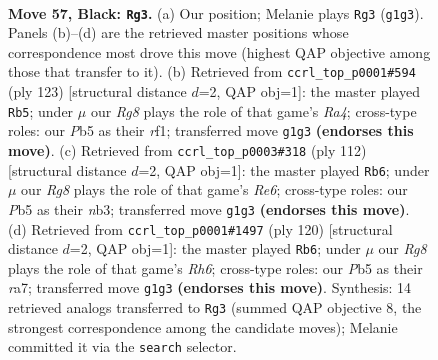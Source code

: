 \documentclass[11pt]{article}
\begin{document}
\clearpage

\begin{figure}[p]\centering
\begin{subfigure}{0.46\textwidth}\centering
\resizebox{\linewidth}{!}{%
\newchessgame
\chessboard[
  setfen={8/5K2/8/1p5k/8/8/8/6r1 b - - 9 57},
  showmover=false,
  pgfstyle=straightmove, color=movearrow, markmove={g1-g3}
]}
\caption{}
\end{subfigure}\hfill
\begin{subfigure}{0.46\textwidth}\centering
\resizebox{\linewidth}{!}{%
\newchessgame
\chessboard[
  setfen={2k5/8/4K3/r7/8/8/8/5R2 b - - 5 62},
  showmover=false,
  pgfstyle=straightmove, color=movearrow, markmove={a5-b5}
]}
\caption{}
\end{subfigure}
\\[4pt]
\begin{subfigure}{0.46\textwidth}\centering
\resizebox{\linewidth}{!}{%
\newchessgame
\chessboard[
  setfen={8/8/4R3/6k1/8/1n4K1/8/8 w - - 1 57},
  showmover=false,
  pgfstyle=straightmove, color=movearrow, markmove={e6-b6}
]}
\caption{}
\end{subfigure}\hfill
\begin{subfigure}{0.46\textwidth}\centering
\resizebox{\linewidth}{!}{%
\newchessgame
\chessboard[
  setfen={8/r7/7R/8/6k1/2K5/8/8 w - - 1 61},
  showmover=false,
  pgfstyle=straightmove, color=movearrow, markmove={h6-b6}
]}
\caption{}
\end{subfigure}
\caption{\textbf{Move 57, Black: \texttt{Rg3}.} (a) Our position; Melanie plays \texttt{Rg3} (\texttt{g1g3}). Panels (b)--(d) are the retrieved master positions whose correspondence most drove this move (highest QAP objective among those that transfer to it). (b) Retrieved from \texttt{ccrl\_top\_p0001\#594} (ply 123) [structural distance $d$=2, QAP obj=1]: the master played \texttt{Rb5}; under $\mu$ our \emph{Rg8} plays the role of that game's \emph{Ra4}; cross-type roles: our \emph{P}b5 as their \emph{r}f1; transferred move \texttt{g1g3} \textbf{(endorses this move)}. (c) Retrieved from \texttt{ccrl\_top\_p0003\#318} (ply 112) [structural distance $d$=2, QAP obj=1]: the master played \texttt{Rb6}; under $\mu$ our \emph{Rg8} plays the role of that game's \emph{Re6}; cross-type roles: our \emph{P}b5 as their \emph{n}b3; transferred move \texttt{g1g3} \textbf{(endorses this move)}. (d) Retrieved from \texttt{ccrl\_top\_p0001\#1497} (ply 120) [structural distance $d$=2, QAP obj=1]: the master played \texttt{Rb6}; under $\mu$ our \emph{Rg8} plays the role of that game's \emph{Rh6}; cross-type roles: our \emph{P}b5 as their \emph{r}a7; transferred move \texttt{g1g3} \textbf{(endorses this move)}. Synthesis: 14 retrieved analogs transferred to \texttt{Rg3} (summed QAP objective 8, the strongest correspondence among the candidate moves); Melanie committed it via the \texttt{search} selector.}
\label{fig:thought-m113}
\end{figure}
\end{document}
